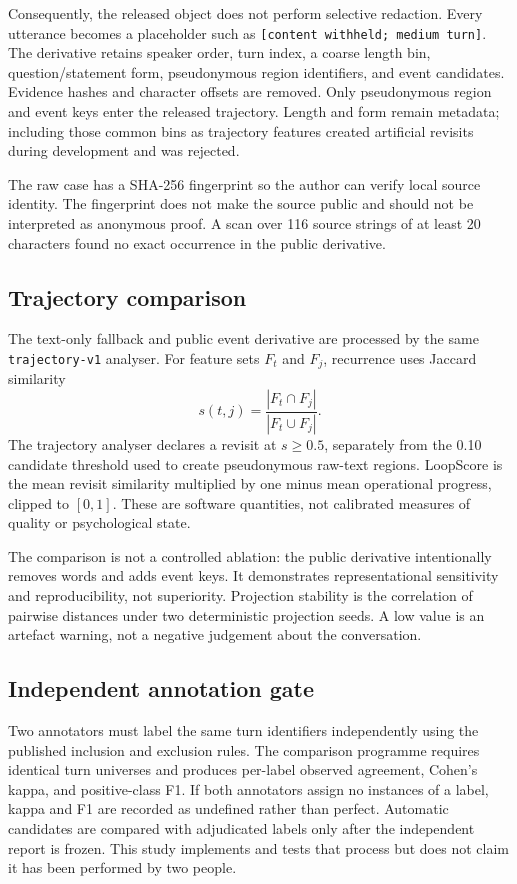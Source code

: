 \documentclass[11pt]{article}
\newcommand{\code}[1]{\texttt{#1}}
\begin{document}
Consequently, the released object does not perform selective redaction. Every
utterance becomes a placeholder such as \code{[content withheld; medium turn]}.
The derivative retains speaker order, turn index, a coarse length bin,
question/statement form, pseudonymous region identifiers, and event candidates.
Evidence hashes and character offsets are removed. Only pseudonymous region and
event keys enter the released trajectory. Length and form remain metadata;
including those common bins as trajectory features created artificial revisits
during development and was rejected.

The raw case has a SHA-256 fingerprint so the author can verify local source
identity. The fingerprint does not make the source public and should not be
interpreted as anonymous proof. A scan over 116 source strings of at least 20
characters found no exact occurrence in the public derivative.

\subsection{Trajectory comparison}

The text-only fallback and public event derivative are processed by the same
\code{trajectory-v1} analyser. For feature sets $F_t$ and $F_j$, recurrence uses
Jaccard similarity
\begin{equation}
s(t,j)=\frac{|F_t\cap F_j|}{|F_t\cup F_j|}.
\end{equation}
The trajectory analyser declares a revisit at $s\geq0.5$, separately from the
0.10 candidate threshold used to create pseudonymous raw-text regions.
LoopScore is the mean revisit similarity multiplied by one minus mean
operational progress, clipped to $[0,1]$. These are software quantities, not
calibrated measures of quality or psychological state.

The comparison is not a controlled ablation: the public derivative intentionally
removes words and adds event keys. It demonstrates representational sensitivity
and reproducibility, not superiority. Projection stability is the correlation
of pairwise distances under two deterministic projection seeds. A low value is
an artefact warning, not a negative judgement about the conversation.

\subsection{Independent annotation gate}

Two annotators must label the same turn identifiers independently using the
published inclusion and exclusion rules. The comparison programme requires
identical turn universes and produces per-label observed agreement, Cohen's
kappa, and positive-class F1. If both annotators assign no instances of a
label, kappa and F1 are recorded as undefined rather than perfect. Automatic
candidates are compared with adjudicated labels only after the independent
report is frozen. This study implements and tests that process but does not
claim it has been performed by two people.
\end{document}
